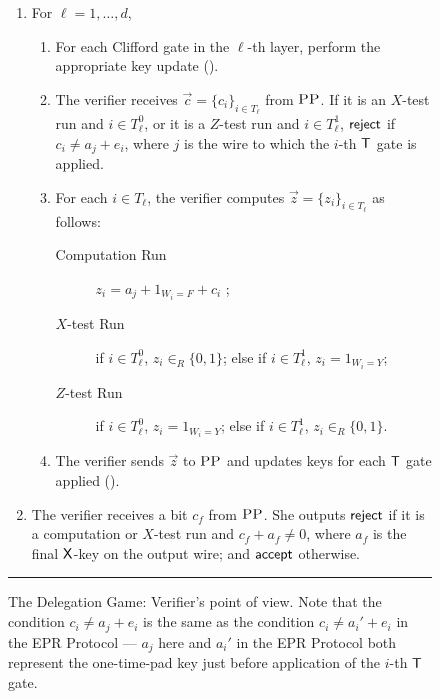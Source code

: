 \documentclass{toc}
\newcommand{\pp}{\textsc{PP}}
\begin{document}
\begin{figure}[H]
\begin{enumerate}
\item For $\ell=1,\dots,d$, 
  \begin{enumerate}
\itemsep=-2pt   %
  \item For each Clifford gate in the $\ell$-th layer, perform the appropriate
    key update ().
  \item The verifier receives $\vec{c} = \{c_i\}_{i\in T_{\ell}}$ from $\pp$. If
it is an $X$-test run and $i\in T_\ell^0$, or it is 
a $Z$-test run and $i\in T_\ell^1$, $\sf reject$ if $c_i\neq a_{j}+ e_i$, where $j$ is the wire to which the $i$-th $\sf T$ gate is applied.
\item For each $i\in T_\ell$, the verifier computes $\vec{z}=\{z_i\}_{i\in T_\ell}$ as follows: 
\begin{description}
\item[Computation Run] $z_i=a_{j}+ 1_{W_i=F} + c_i$ ;
\item[$X$-test Run] if $i\in T_\ell^0$, $z_i\in_R\{0,1\}$; else if $i\in T_\ell^1$, $z_i=1_{W_i=Y}$;
\item[$Z$-test Run] if $i\in T_\ell^0$, $z_i=1_{W_i=Y}$; else if $i\in T_\ell^1$, $z_i\in_R\{0,1\}$.
\end{description}
\item The verifier sends $\vec{z}$ to $\pp$ and updates keys for each $\sf T$
  gate applied ().
\end{enumerate} 
\item The verifier receives a bit $c_f$ from $\pp$. She outputs $\sf reject$ if
it is a computation or $X$-test run and $c_f+ a_f\neq 0$, where $a_f$ is the final $\sf X$-key on the output wire; and $\sf accept$ otherwise.
\end{enumerate}
\vspace{-0.08cm} 
\rule[2ex]{\textwidth}{0.5pt}\vspace{-.5cm}     %
\caption{The Delegation Game: Verifier's point of view. Note that the condition $c_i\neq a_j+e_i$ is the same as the condition $c_i\neq a_i'+e_i$ in the EPR Protocol --- $a_j$ here and $a_i'$ in the EPR Protocol both represent the one-time-pad key just before application of the $i$-th $\sf T$ gate.}\label{fig:leash-protocol-V}
\end{figure}
\end{document}

